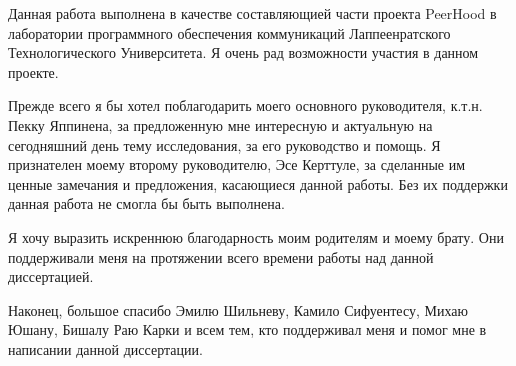\Sentence
Данная работа выполнена в качестве составляющией части проекта PeerHood в лаборатории программного 
обеспечения коммуникаций Лаппеенратского Технологического Университета. 
\Sentence
Я очень рад возможности участия в данном проекте.

\Sentence
Прежде всего я бы хотел поблагодарить моего основного руководителя, к.т.н. Пекку Яппинена, 
за предложенную мне интересную и актуальную на сегодняшний день тему исследования, за его 
руководство и помощь.
\Sentence
Я признателен моему второму руководителю, Эсе Керттуле, за сделанные им ценные замечания и 
предложения, касающиеся данной работы. 
\Sentence
Без их поддержки данная работа не смогла бы быть выполнена.

\Sentence
Я хочу выразить искреннюю благодарность моим родителям и моему брату. 
Они поддерживали меня на протяжении всего времени работы над данной диссертацией.

\Sentence
Наконец, большое спасибо Эмилю Шильневу, Камило Сифуентесу, Михаю Юшану, Бишалу Раю Карки и всем 
тем, кто поддерживал меня и помог мне в написании данной диссертации.